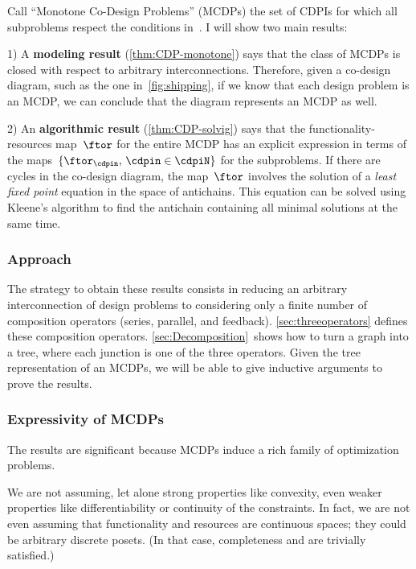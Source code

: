 Call ``Monotone Co-Design Problems'' (MCDPs) the set of CDPIs for
which all subproblems respect the conditions in~.
 I will show two main results:

1) A \textbf{modeling result} (\cref{thm:CDP-monotone})
says that the class of MCDPs is closed with respect to arbitrary interconnections.
Therefore, given a co-design diagram, such as the one in~\cref{fig:shipping},
if we know that each design problem is an MCDP, we can conclude that
the diagram represents an MCDP as well.

2) An \textbf{algorithmic result }(\cref{thm:CDP-solvig})
says that the functionality-resources map~$\ftor$ for the entire
MCDP has an explicit expression in terms of the maps~$\{\ftor_{\cdpin},\,\cdpin\in\cdpiN\}$
for the subproblems. If there are cycles in the co-design diagram,
the map~$\ftor$ involves the solution of a\emph{ least fixed point}
equation in the space of antichains. This equation can be solved using
Kleene's algorithm to find the antichain containing all minimal solutions
at the same time.

\subsubsection{Approach}

The strategy to obtain these results consists in reducing an arbitrary
interconnection of design problems to considering\emph{ }only a finite
number of composition operators (series, parallel, and feedback).
\cref{sec:threeoperators} defines these composition operators. \cref{sec:Decomposition}~shows
how to turn a graph into a tree, where each junction is one of the
three operators. Given the tree representation of an MCDPs, we will
be able to give inductive arguments to prove the results. 


\subsubsection{Expressivity of MCDPs}

The results are significant because MCDPs induce a rich family of
optimization problems. 

We are not assuming, let alone strong properties like convexity, even
weaker properties like differentiability or continuity of the constraints.
In fact, we are not even assuming that functionality and resources
are continuous spaces; they could be arbitrary discrete posets. (In
that case, completeness and \scottcontinuity are trivially satisfied.)


